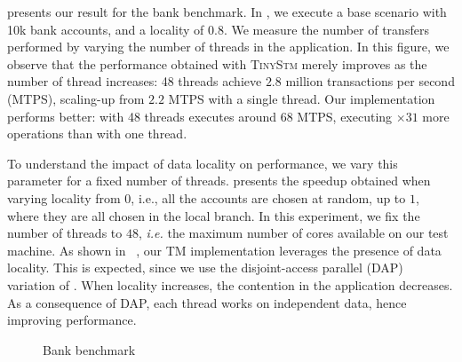  presents our result for the bank benchmark.
In , we execute a base scenario with 10k bank accounts, and a locality of 0.8.
We measure the number of transfers performed by varying the number of threads in the application.
In this figure, we observe that the performance obtained with \textsc{TinyStm} merely improves as the number of thread increases: 48 threads achieve $2.8$ million transactions per second (MTPS), scaling-up from $2.2$ MTPS with a single thread.
Our implementation performs better: with 48 threads  executes around 68 MTPS, executing $\times 31$ more operations than with one thread.

To understand the impact of data locality on performance, we vary this parameter for a fixed number of threads.
 presents the speedup obtained when varying locality from $0$, i.e., all the accounts are chosen at random, up to $1$, where they are all chosen in the local branch.
In this experiment, we fix the number of threads to $48$, \emph{i.e.} the maximum number of cores available on our test machine.
As shown in ~, our TM implementation leverages the presence of data locality.
This is expected, since we use the disjoint-access parallel (DAP) variation of .
When locality increases, the contention in the application decreases.
As a consequence of DAP, each thread works on independent data, hence improving performance.

\begin{figure}[!t]
  \centering
  \caption{
    Bank benchmark
  }
\end{figure}

